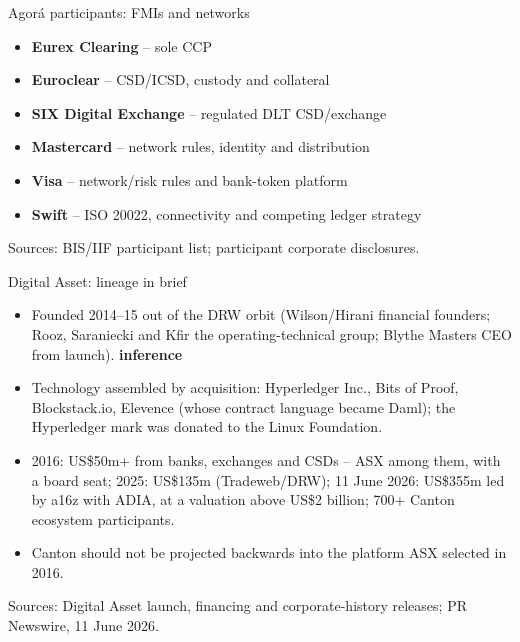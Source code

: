 \documentclass[aspectratio=169,12pt]{beamer}
\newcommand{\rust}[1]{\textcolor{Rust}{\textbf{#1}}}
\newcommand{\source}[1]{\vfill\par\fontsize{5.4}{6.5}\selectfont\color{Quiet}Sources: #1}
\newcommand{\tightitems}{\setlength{\itemsep}{0.42em}\setlength{\parskip}{0pt}}
\newcommand{\tinf}{\textcolor{Ocean}{\bfseries inference}}
\begin{document}
\begin{frame}{Agor\'a participants: FMIs and networks}
  \begin{itemize}\tightitems
    \item \rust{Eurex Clearing} -- sole CCP
    \item \rust{Euroclear} -- CSD/ICSD, custody and collateral
    \item \rust{SIX Digital Exchange} -- regulated DLT CSD/exchange
    \item \rust{Mastercard} -- network rules, identity and distribution
    \item \rust{Visa} -- network/risk rules and bank-token platform
    \item \rust{Swift} -- ISO 20022, connectivity and competing ledger strategy
  \end{itemize}
  \source{BIS/IIF participant list; participant corporate disclosures.}
\end{frame}
\fi

\begin{frame}{Digital Asset: lineage in brief}
  \fontsize{9.9}{11.8}\selectfont
  \begin{itemize}\tightitems
    \item Founded 2014--15 out of the DRW orbit (Wilson/Hirani financial founders; Rooz, Saraniecki and Kfir the operating-technical group; Blythe Masters CEO from launch). \tinf
    \item Technology assembled by acquisition: Hyperledger Inc., Bits of Proof, Blockstack.io, Elevence (whose contract language became Daml); the Hyperledger mark was donated to the Linux Foundation.
    \item 2016: US\$50m+ from banks, exchanges and CSDs -- ASX among them, with a board seat; 2025: US\$135m (Tradeweb/DRW); 11 June 2026: US\$355m led by a16z with ADIA, at a valuation above US\$2 billion; 700+ Canton ecosystem participants.
    \item Canton should not be projected backwards into the platform ASX selected in 2016.
  \end{itemize}
  \source{Digital Asset launch, financing and corporate-history releases; PR Newswire, 11 June 2026.}
\end{frame}
\end{document}

